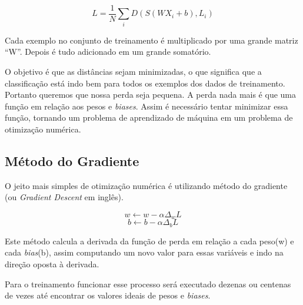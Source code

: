 \begin{equation}
  L = \displaystyle\frac{1}{N}\displaystyle\sum_iD(S(WX_i + b), L_i)
\end{equation}

Cada exemplo no conjunto de treinamento é multiplicado por uma grande
matriz ``W''. Depois é tudo adicionado em um grande somatório.

O objetivo é que as distâncias sejam minimizadas, o que significa que a
classificação está indo bem para todos os exemplos dos dados de
treinamento. Portanto queremos que nossa perda seja pequena. A
perda nada mais é que uma função em relação aos pesos e
\textit{biases}. Assim é necessário tentar minimizar essa função,
tornando um problema de aprendizado de máquina em um problema de
otimização numérica.

\subsection{Método do Gradiente}

O jeito mais simples de otimização numérica é utilizando método do
gradiente (ou \textit{Gradient Descent} em inglês).

\begin{equation}
  w \leftarrow w - \alpha \Delta_w L
\end{equation}
\begin{equation}
  b \leftarrow b - \alpha \Delta_b L
\end{equation}

Este método calcula a derivada da função de perda em relação a cada
peso(w) e cada \textit{bias}(b), assim computando um novo valor para
essas variáveis e indo na direção oposta à derivada.

Para o treinamento funcionar esse processo será executado dezenas ou
centenas de vezes até encontrar os valores ideais de pesos e
\textit{biases}.

